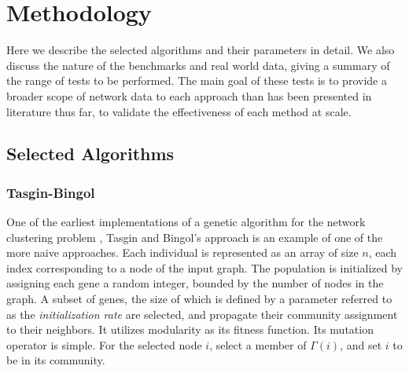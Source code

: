 \chapter{Methodology}
Here we describe the selected algorithms and their parameters in detail. We also discuss the nature of the benchmarks and real world data, giving a summary of the range of tests to be performed. The main goal of these tests is to provide a broader scope of network data to each approach than has been presented in literature thus far, to validate the effectiveness of each method at scale.

\section{Selected Algorithms}
\subsection{Tasgin-Bingol}
One of the earliest implementations of a genetic algorithm for the network clustering problem \cite{Tasgin2006}, Tasgin and Bingol's approach is an example of one of the more naive approaches. Each individual is represented as an array of size $n$, each index corresponding to a node of the input graph. The population is initialized by assigning each gene a random integer, bounded by the number of nodes in the graph. A subset of genes, the size of which is defined by a parameter referred to as the \textit{initialization rate} are selected, and propagate their community assignment to their neighbors. It utilizes modularity as its fitness function. Its mutation operator is simple. For the selected node $i$, select a member of $\Gamma(i)$, and set $i$ to be in its community.

